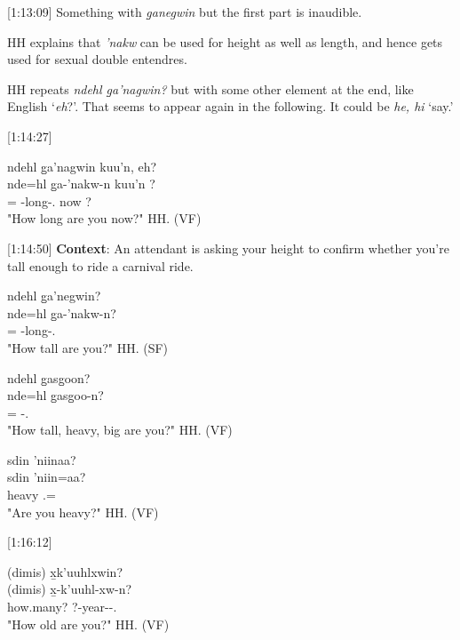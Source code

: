[1:13:09]
Something with \textit{g̱anegwin} but the first part is inaudible.

HH explains that \textit{'nakw} can be used for height as well as length, and hence gets used for sexual double entendres. 

HH repeats \textit{ndehl g̱a'nagwin?} but with some other element at the end, like English `\textit{eh}?'. That seems to appear again in the following. It could be \textit{he, hi} `say.'

[1:14:27]
\begin{exe}
    \ex \glll
    ndehl g̱a'nagwin kuu'n, eh? \\
    nde=hl g̱a-'nakw-n kuu'n ? \\
    \Wh=\Cn{} \Distr-long-\Ssg.\Ii{} now ?\\
    \glt "How long are you now?" \hfill HH.\ElicitationDate{} (VF)
\end{exe}

[1:14:50] \textbf{Context}: An attendant is asking your height to confirm whether you're tall enough to ride a carnival ride. 

\begin{exe}
    \ex \begin{xlist}
        \ex \glll
        ndehl g̱a'negwin? \\
        nde=hl g̱a-'nakw-n? \\
        \Wh=\Cn{} \Distr-long-\Ssg.\Ii \\
        \glt "How tall are you?" \hfill HH.\ElicitationDate{} (SF)

        \ex \glll
        ndehl g̱asg̱oon? \\
        nde=hl g̱asg̱oo-n? \\
        \Wh=\Cn{} \Mass-\Ssg.\Ii \\
        \glt "How tall, heavy, big are you?" \hfill HH.\ElicitationDate{} (VF)

        \ex \glll 
        sdin 'niinaa? \\
        sdin 'niin=aa? \\
        heavy \Ssg.\Iii=\Q \\
        \glt "Are you heavy?" \hfill HH.\ElicitationDate{} (VF)
    \end{xlist} 
\end{exe}

[1:16:12]
\begin{exe}
    \ex 
    \glll
    (dimis) x̱k'uuhlxwin? \\
    (dimis) x̱-k'uuhl-xw-n? \\
    how.many? ?-year-\Val-\Ssg.\Ii \\
    \glt "How old are you?" \hfill HH.\ElicitationDate{} (VF)
\end{exe}

